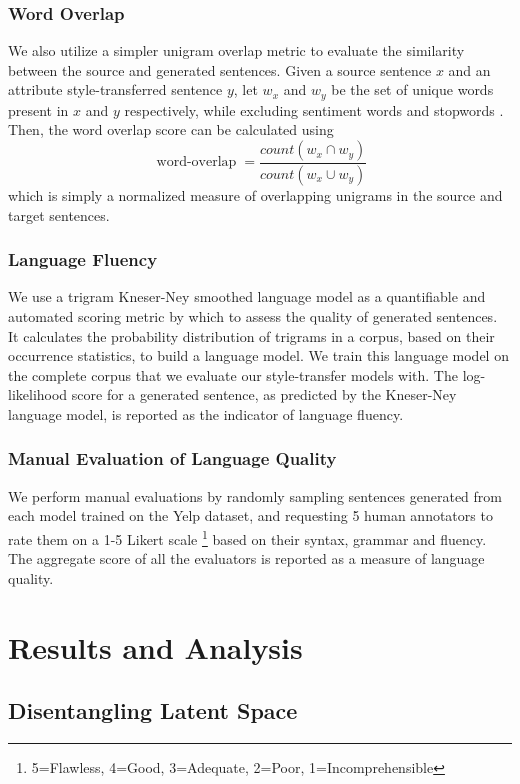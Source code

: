 \documentclass[letterpaper]{article} %
\begin{document}
\subsubsection{Word Overlap}
We also utilize a simpler unigram overlap metric to evaluate the similarity between the source and generated sentences. Given a source sentence $x$ and an attribute style-transferred sentence $y$, let $w_x$ and $w_y$ be the set of unique words present in $x$ and $y$ respectively, while excluding sentiment words \cite{hu2004mining} and stopwords \cite{bird2004nltk}. Then, the word overlap score can be calculated using $$\operatorname{word-overlap} = \frac{count(w_x \cap w_y)}{count(w_x \cup w_y)}$$ which is simply a normalized measure of overlapping unigrams in the source and target sentences.

\subsubsection{Language Fluency}
We use a trigram Kneser-Ney smoothed language model \cite{kneser1995improved} as a quantifiable and automated scoring metric by which to assess the quality of generated sentences. It calculates the probability distribution of trigrams in a corpus, based on their occurrence statistics, to build a language model. We train this language model on the complete corpus that we evaluate our style-transfer models with. The log-likelihood score for a generated sentence, as predicted by the Kneser-Ney language model, is reported as the indicator of language fluency.

\subsubsection{Manual Evaluation of Language Quality}
We perform manual evaluations by randomly sampling sentences generated from each model trained on the Yelp dataset, and requesting 5 human annotators to rate them on a 1-5 Likert scale \footnote{5=Flawless, 4=Good, 3=Adequate, 2=Poor, 1=Incomprehensible} \cite{stent2005evaluating} based on their syntax, grammar and fluency. The aggregate score of all the evaluators is reported as a measure of language quality.


\section{Results and Analysis}

\subsection{Disentangling Latent Space}
\end{document}
